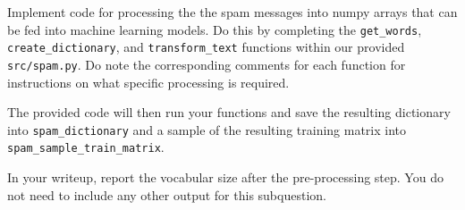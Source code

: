 \item {}
Implement code for processing the the spam messages into numpy arrays that can be fed into machine learning models. Do this by completing the \texttt{get\_words}, \texttt{create\_dictionary}, and \texttt{transform\_text} functions within our provided \texttt{src/spam.py}. Do note the corresponding comments for each function for instructions on what specific processing is required.

The provided code will then run your functions and save the resulting dictionary into \texttt{spam\_dictionary} and a sample of the resulting training matrix into\\
\texttt{spam\_sample\_train\_matrix}.


In your writeup, report the vocabular size after the pre-processing step. You do not need to include any other output for this subquestion.




